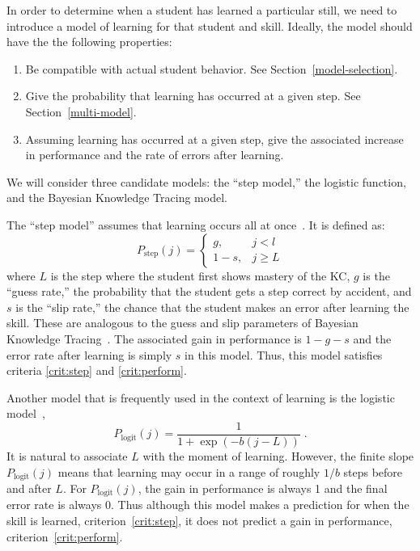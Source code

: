 \documentclass[prodmode,acmtecs]{acmsmall}
\begin{document}
In order to determine when a student has learned a particular still,
we need to introduce a model of learning for that student and skill.
Ideally, the model should have the the following properties:
\label{model-criteria}
%
\begin{enumerate} 

\item Be compatible with actual student behavior.
      See Section~\ref{model-selection}.

\item \label{crit:step}
      Give the probability that learning has occurred at a given step.
      See Section~\ref{multi-model}.

\item  \label{crit:perform}
      Assuming learning has occurred at a given step, give the 
     associated increase in performance and 
     the rate of errors after learning.

\end{enumerate}
%
We will consider three candidate models:  the ``step model,'' 
the logistic function, and the Bayesian Knowledge Tracing model.

The ``step model'' assumes that learning occurs all at 
once~\cite{aha-moments}.  It is defined as:
%
\begin{equation}
    P_\mathrm{step}(j)= \left\{\begin{array}{cc}
                 g, & j<l \\
                 1-s, & j\ge L 
                 \end{array} \right. 
\end{equation}
%
where $L$ is the step where the student first shows mastery of the
KC, $g$ is the ``guess rate,'' the probability that the student
gets a step correct by accident, and $s$ is the ``slip rate,''
the chance that the student makes an error after learning
the skill.  These are analogous to the guess and slip parameters 
of Bayesian Knowledge Tracing~\cite{anderson}.  
The associated gain in performance
is $1-g-s$ and the error rate after learning is simply $s$ in this
model.  Thus, this model satisfies criteria \ref{crit:step} and
\ref{crit:perform}.

Another model that is frequently used in the context of 
learning is the logistic model~\cite{logit},
%
\begin{equation}
    P_\mathrm{logit}(j)= \frac{1}{1+\exp\left(-b (j-L)\right)} \; .
\end{equation}
%
It is natural to associate $L$ with the moment of learning.  However,
the finite slope $P_\mathrm{logit}(j)$ means that learning may occur
in a range of roughly $1/b$ steps before and after $L$.    For  
$P_\mathrm{logit}(j)$, the gain in performance is always 1 and the final error
rate is always 0.  Thus although this model makes a prediction for
when the skill is learned, criterion~\ref{crit:step}, it does
not predict a gain in performance, criterion~\ref{crit:perform}.
\end{document}

